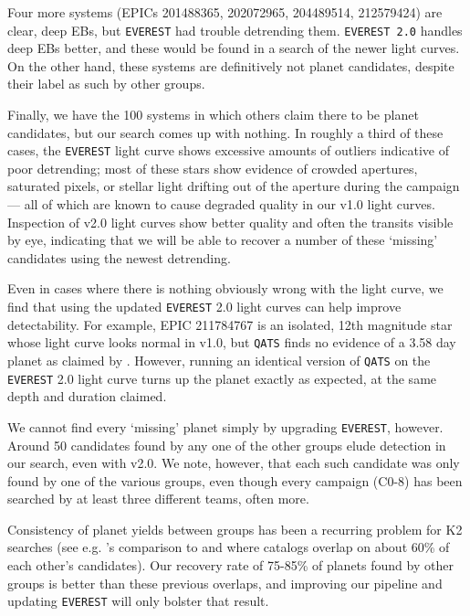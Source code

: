 \documentclass[twocolumn]{aastex62}
\newcommand{\pipeline}[1]{\texttt{#1}}
\begin{document}
Four more systems (EPICs 201488365, 202072965, 204489514, 212579424)
are clear, deep EBs, but \pipeline{EVEREST} had trouble detrending
them. \pipeline{EVEREST 2.0} handles deep EBs better, and these would
be found in a search of the newer light curves. On the other hand,
these systems are definitively not planet candidates, despite their
label as such by other groups.

Finally, we have the 100 systems in which others claim there to be
planet candidates, but our search comes up with nothing. In roughly a
third of these cases, the \pipeline{EVEREST} light curve shows
excessive amounts of outliers indicative of poor detrending; most of
these stars show evidence of crowded apertures, saturated pixels, or
stellar light drifting out of the aperture during the campaign --- all
of which are known to cause degraded quality in our v1.0 light
curves. Inspection of v2.0 light curves show better quality and often
the transits visible by eye, indicating that we will be able to
recover a number of these `missing' candidates using the newest
detrending.

Even in cases where there is nothing obviously wrong with the light
curve, we find that using the updated \pipeline{EVEREST} 2.0 light
curves can help improve detectability. For example, EPIC 211784767 is
an isolated, 12th magnitude star whose light curve looks normal in
v1.0, but \pipeline{QATS} finds no evidence of a 3.58 day planet as
claimed by \cite{bar16a}. However, running an identical version of
\pipeline{QATS} on the \pipeline{EVEREST} 2.0 light curve turns up the
planet exactly as expected, at the same depth and duration claimed.

We cannot find every `missing' planet simply by upgrading
\pipeline{EVEREST}, however. Around 50 candidates found by any one of
the other groups elude detection in our search, even with v2.0. We
note, however, that each such candidate was only found by one of the
various groups, even though every campaign (C0-8) has been searched by
at least three different teams, often more.

Consistency of planet yields between groups has been a recurring
problem for K2 searches (see e.g. \cite{pet18}'s comparison to
\cite{pop16} and \cite{bar16a} where catalogs overlap on about 60\% of
each other's candidates). Our recovery rate of 75-85\% of planets
found by other groups is better than these previous overlaps, and
improving our pipeline and updating \pipeline{EVEREST} will only
bolster that result.
\end{document}
